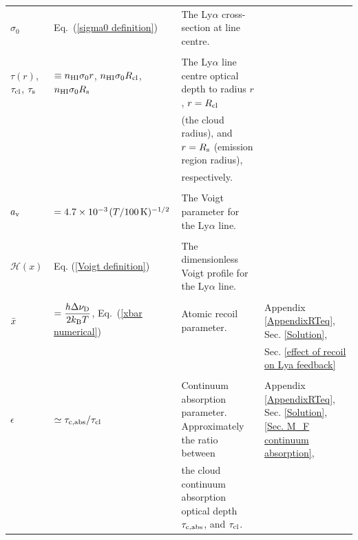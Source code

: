 \documentclass[fleqn,usenatbib]{mnras}
\newcommand{\taucl}{\tau_{\rm cl}}
\begin{document}
\begin{table}
\begin{tabular}{l l l l }
   \\
 
   $\sigma_0$ &  Eq.~(\ref{sigma0 definition})  & The Ly$\alpha$ cross-section at line centre. &  \\ 

   \\
 
   $\tau(r)$, $\taucl$, $\tau_{\rm s}$ &  $\equiv n_{\rm HI} \sigma_0 r$, $n_{\rm HI} \sigma_0 R_{\rm cl}$, 
 $n_{\rm HI} \sigma_0 R_{\rm s}$  & The Ly$\alpha$ line centre optical depth to radius $r$, $r = R_{\rm cl}$ &  \\ 

   &    &(the cloud radius), and $r = R_{\rm s}$ (emission region radius),   &  \\ 

   &    &respectively.   &  \\ 

   \\
 
  $a_{\rm v}$ &  $= 4.7 \times 10^{-3} \hspace{1 pt} (T/100\,\rm K)^{-1/2}$  & The Voigt parameter for the Ly$\alpha$ line. &  \\ 

 
 \\
 
  $\mathcal{H}(x)$ &  Eq.  (\ref{Voigt definition})  & The dimensionless Voigt profile for the Ly$\alpha$ line. &  \\ 

 \\

   $\Bar{x}$ &  $= \dfrac{h \Delta \nu_{\rm D}}{2 k_{\rm B}T}$,  Eq.~(\ref{xbar numerical})  & Atomic recoil parameter. &  Appendix \ref{AppendixRTeq}, Sec. \ref{Solution},  \\ 

    &   & &   Sec. \ref{effect of recoil on Lya feedback} \\ 

 \\
 
  $\epsilon$ &  $\simeq \tau_{\rm c,abs}/\taucl$  & Continuum absorption parameter. Approximately the ratio between & Appendix \ref{AppendixRTeq}, Sec. \ref{Solution}, \ref{Sec. M_F continuum absorption},  \\

   &  & the cloud continuum absorption optical depth $\tau_{\rm c,abs}$, and $\taucl$. &  \\ 


\end{tabular}
\end{table}
\end{document}
